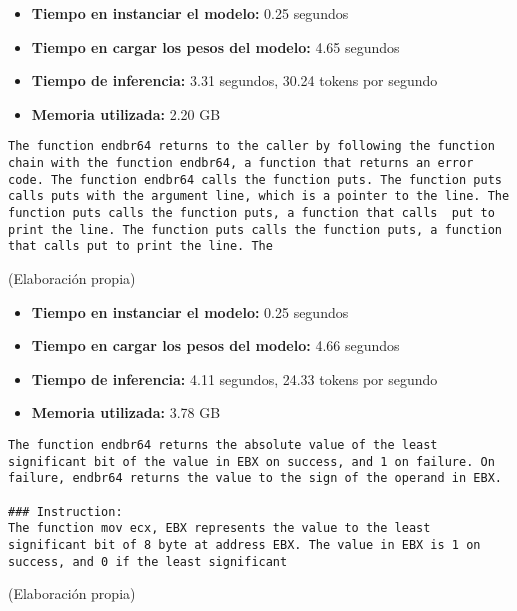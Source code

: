 \begin{itemize}
    \item \textbf{Tiempo en instanciar el modelo:} 0.25 segundos
    \item \textbf{Tiempo en cargar los pesos del modelo:} 4.65 segundos
    \item \textbf{Tiempo de inferencia:} 3.31 segundos, 30.24 tokens por segundo
    \item \textbf{Memoria utilizada:} 2.20 GB
\end{itemize}

\begin{mycode}
    \begin{verbatim}
The function endbr64 returns to the caller by following the function chain with the function endbr64, a function that returns an error code. The function endbr64 calls the function puts. The function puts calls puts with the argument line, which is a pointer to the line. The function puts calls the function puts, a function that calls  put to print the line. The function puts calls the function puts, a function that calls put to print the line. The
    \end{verbatim}
    \caption[]{ (Elaboración propia)}
    \label{code:}
\end{mycode}

\begin{itemize}
    \item \textbf{Tiempo en instanciar el modelo:} 0.25 segundos
    \item \textbf{Tiempo en cargar los pesos del modelo:} 4.66 segundos
    \item \textbf{Tiempo de inferencia:} 4.11 segundos, 24.33 tokens por segundo
    \item \textbf{Memoria utilizada:} 3.78 GB
\end{itemize}

\begin{mycode}
    \begin{verbatim}
The function endbr64 returns the absolute value of the least significant bit of the value in EBX on success, and 1 on failure. On failure, endbr64 returns the value to the sign of the operand in EBX.

### Instruction:
The function mov ecx, EBX represents the value to the least significant bit of 8 byte at address EBX. The value in EBX is 1 on success, and 0 if the least significant
    \end{verbatim}
    \caption[]{ (Elaboración propia)}
    \label{code:}
\end{mycode}

